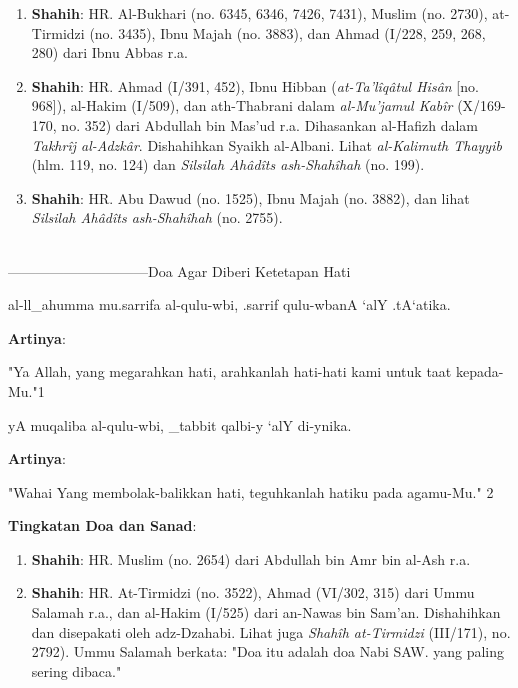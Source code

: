 \documentclass[a4paper,12pt]{article}
\begin{document}
\begin{enumerate}
\item \textbf{Shahih}: HR. Al-Bukhari (no. 6345, 6346, 7426, 7431), Muslim 
(no. 2730), at-Tirmidzi (no. 3435), Ibnu Majah (no. 3883), dan Ahmad 
(I/228, 259, 268, 280) dari Ibnu Abbas r.a.
\item \textbf{Shahih}: HR. Ahmad (I/391, 452), Ibnu Hibban 
(\textit{at-Ta'l\^{i}q\^{a}tul His\^{a}n} [no. 968]), al-Hakim (I/509), dan
ath-Thabrani dalam \textit{al-Mu'jamul Kab\^{i}r} (X/169-170, no. 352) dari
Abdullah bin Mas'ud r.a. Dihasankan al-Hafizh dalam \textit{Takhr\^{i}j 
al-Adzk\^{a}r}. Dishahihkan Syaikh al-Albani. Lihat \textit{al-Kalimuth 
Thayyib} (hlm. 119, no. 124) dan \textit{Silsilah Ah\^{a}d\^{i}ts 
ash-Shah\^{i}hah} (no. 199).
\item \textbf{Shahih}: HR. Abu Dawud (no. 1525), Ibnu Majah (no. 3882), dan
lihat \textit{Silsilah Ah\^{a}d\^{i}ts ash-Shah\^{i}hah} (no. 2755).\\\\
\end{enumerate}
\par
{}------------------------------Doa Agar Diberi Ketetapan Hati
\begin{arabtext}
\noindent
al-ll_ahumma mu.sarrifa al-qulu-wbi, .sarrif qulu-wbanA `alY .tA`atika.\\
\end{arabtext}
\noindent
\textbf{Artinya}:
\par
\indent
"Ya Allah, yang megarahkan hati, arahkanlah hati-hati kami untuk taat 
kepada-Mu."{\scriptsize 1}\\
\begin{arabtext}
\noindent
yA muqaliba al-qulu-wbi, _tabbit qalbi-y `alY di-ynika.\\
\end{arabtext}
\noindent
\textbf{Artinya}:
\par
\indent
"Wahai Yang membolak-balikkan hati, teguhkanlah hatiku pada agamu-Mu."
{\scriptsize 2}\\
\par
\noindent
\textbf{Tingkatan Doa dan Sanad}:
\begin{enumerate}
\item \textbf{Shahih}: HR. Muslim (no. 2654) dari Abdullah bin Amr bin 
al-Ash r.a.
\item \textbf{Shahih}: HR. At-Tirmidzi (no. 3522), Ahmad (VI/302, 315) dari 
Ummu Salamah r.a., dan al-Hakim (I/525) dari an-Nawas bin Sam'an. 
Dishahihkan dan disepakati oleh adz-Dzahabi. Lihat juga \textit{Shah\^{i}h 
at-Tirmidzi} (III/171), no. 2792). Ummu Salamah berkata: "Doa itu adalah 
doa Nabi SAW. yang paling sering dibaca."\\\\
\end{enumerate}
\end{document}
